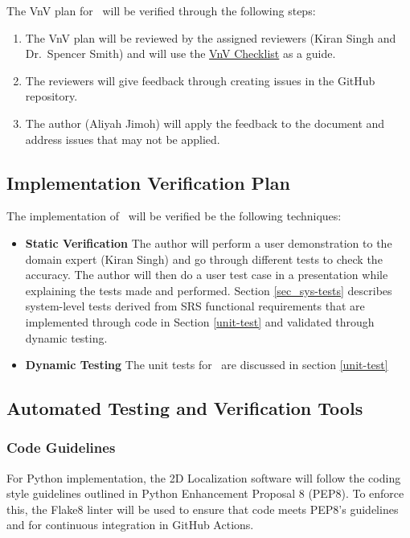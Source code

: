 \documentclass[12pt, titlepage]{article}
\begin{document}
The VnV plan for \progname~will be verified through the following steps:
\begin{enumerate}
  \item The VnV plan will be reviewed by the assigned reviewers (Kiran Singh and Dr.~Spencer Smith) and will use the \href{https://github.com/AliyahJimoh/2D-Localizer/blob/main/docs/Checklists/VnV-Checklist.pdf}{VnV Checklist} as a guide.
  \item The reviewers will give feedback through creating issues in the GitHub repository.
  \item The author (Aliyah Jimoh) will apply the feedback to the document and address issues that may not be applied.
\end{enumerate}

\subsection{Implementation Verification Plan}\label{plan_implement}

The implementation of \progname~will be verified be the following techniques:
\begin{itemize}
  \item \textbf{Static Verification}
  \newline  
    The author will perform a user demonstration to the domain expert (Kiran Singh) and go through different tests to check the accuracy. The author will then do a user test case in a presentation while explaining the tests made and performed. Section \ref{sec_sys-tests} describes system-level tests derived from SRS functional requirements that are implemented through code in Section \ref{unit-test} and validated through dynamic testing.

  \item \textbf{Dynamic Testing}
  \newline
  The unit tests for \progname~are discussed in section \ref{unit-test} 

\end{itemize}

\subsection{Automated Testing and Verification Tools}\label{plan_auto}

\subsubsection{Code Guidelines}
For Python implementation, the 2D Localization software will follow the coding style guidelines outlined in Python Enhancement Proposal 8 (PEP8). To enforce this, the Flake8 linter will be used to ensure that code meets PEP8's guidelines and for continuous integration in GitHub Actions.
\end{document}

